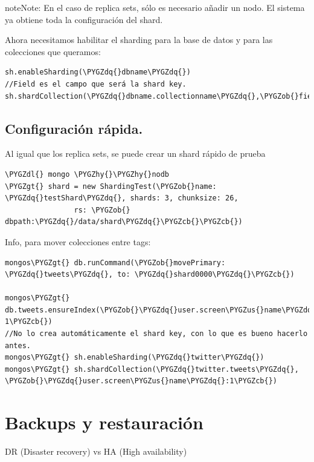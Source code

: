\documentclass[a4paper,10pt,english]{sphinxmanual}
\def\PYGZus{\char`\_}
\def\PYGZob{\char`\{}
\def\PYGZcb{\char`\}}
\def\PYGZgt{\char`\>}
\def\PYGZdl{\char`\$}
\def\PYGZhy{\char`\-}
\def\PYGZdq{\char`\"}
\begin{document}
\begin{notice}{note}{Note:}
En el caso de replica sets, sólo es necesario añadir un nodo. El sistema ya obtiene toda la configuración del shard.
\end{notice}

Ahora necesitamos habilitar el sharding para la base de datos y para las colecciones que queramos:

\begin{Verbatim}[commandchars=\\\{\}]
sh.enableSharding(\PYGZdq{}dbname\PYGZdq{})
//Field es el campo que será la shard key.
sh.shardCollection(\PYGZdq{}dbname.collectionname\PYGZdq{},\PYGZob{}field:1\PYGZcb{})
\end{Verbatim}


\section{Configuración rápida.}
\label{contents/sharding:configuracion-rapida}
Al igual que los replica sets, se puede crear un shard rápido de prueba

\begin{Verbatim}[commandchars=\\\{\}]
\PYGZdl{} mongo \PYGZhy{}\PYGZhy{}nodb
\PYGZgt{} shard = new ShardingTest(\PYGZob{}name: \PYGZdq{}testShard\PYGZdq{}, shards: 3, chunksize: 26,
                rs: \PYGZob{} dbpath:\PYGZdq{}/data/shard\PYGZdq{}\PYGZcb{}\PYGZcb{})
\end{Verbatim}

Info, para mover colecciones entre tags:

\begin{Verbatim}[commandchars=\\\{\}]
mongos\PYGZgt{} db.runCommand(\PYGZob{}movePrimary: \PYGZdq{}tweets\PYGZdq{}, to: \PYGZdq{}shard0000\PYGZdq{}\PYGZcb{})

mongos\PYGZgt{} db.tweets.ensureIndex(\PYGZob{}\PYGZdq{}user.screen\PYGZus{}name\PYGZdq{}: 1\PYGZcb{})
//No lo crea automáticamente el shard key, con lo que es bueno hacerlo antes.
mongos\PYGZgt{} sh.enableSharding(\PYGZdq{}twitter\PYGZdq{})
mongos\PYGZgt{} sh.shardCollection(\PYGZdq{}twitter.tweets\PYGZdq{}, \PYGZob{}\PYGZdq{}user.screen\PYGZus{}name\PYGZdq{}:1\PYGZcb{})
\end{Verbatim}


\chapter{Backups y restauración}
\label{contents/backups::doc}\label{contents/backups:backups-y-restauracion}
DR (Disaster recovery) vs HA (High availability)
\end{document}
